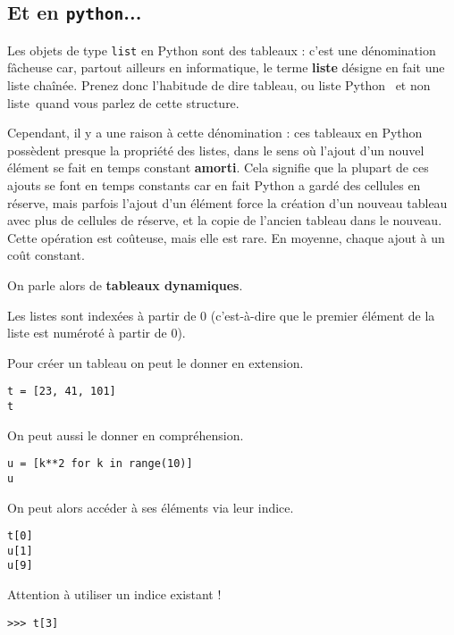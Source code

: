 \subsection{Et en \texttt{python}...}

Les objets de type \texttt{list} en Python sont des tableaux : c'est une 
dénomination fâcheuse car, partout ailleurs en informatique, le terme
\textbf{liste} désigne en fait une liste chaînée. Prenez donc
l'habitude de dire \og tableau\fg, ou \og liste Python \fg\ et non \og liste\fg\ quand vous parlez de cette
structure.

Cependant, il y a une raison à cette dénomination : ces tableaux en Python possèdent presque 
la propriété des listes, dans le sens où l'ajout d'un nouvel élément se fait en temps constant 
\textbf{amorti}. Cela signifie que la plupart de ces ajouts se font en temps constants car en fait 
Python a \og gardé des cellules en réserve\fg, mais parfois l'ajout d'un élément force la création 
d'un nouveau tableau avec plus de cellules de réserve, et la copie de l'ancien tableau dans le 
nouveau. Cette opération est coûteuse, mais elle 
est rare. En moyenne, chaque ajout à un coût constant.

On parle alors de \textbf{tableaux dynamiques}.


\begin{remarque}
Les listes sont indexées à partir de 0 (c'est-à-dire que le premier élément de la liste est numéroté à partir de 0). 
\end{remarque}

Pour créer un tableau on peut le donner en extension.

\begin{lstlisting}
t = [23, 41, 101]
t
\end{lstlisting}

On peut aussi le donner en compréhension.

\begin{lstlisting}
u = [k**2 for k in range(10)]
u
\end{lstlisting}
On peut alors accéder à ses éléments via leur indice.
\begin{lstlisting}
t[0]
u[1]
u[9]
\end{lstlisting}

Attention à utiliser un indice existant !
\begin{lstlisting}
>>> t[3]
\end{lstlisting}

